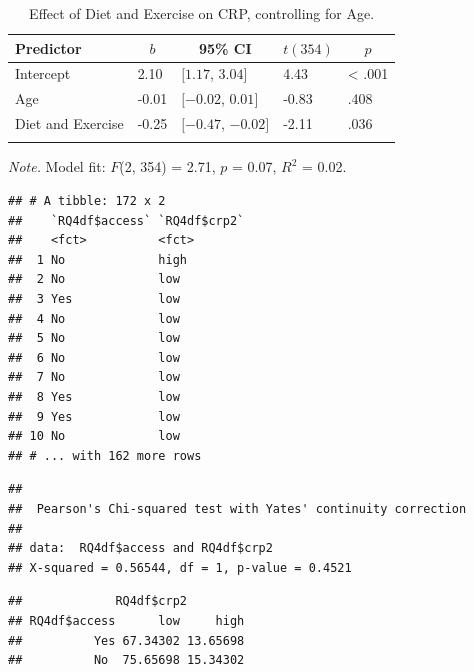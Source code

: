 \documentclass[
  man]{apa6}
\begin{document}
\begin{table}[tbp]

\begin{center}
\begin{threeparttable}

\caption{\label{tab:RQ2}Effect of Diet and Exercise on CRP, controlling for Age.}

\begin{tabular}{lllll}
\toprule
Predictor & \multicolumn{1}{c}{$b$} & \multicolumn{1}{c}{95\% CI} & \multicolumn{1}{c}{$t(354)$} & \multicolumn{1}{c}{$p$}\\
\midrule
Intercept & 2.10 & $[1.17$, $3.04]$ & 4.43 & < .001\\
Age & -0.01 & $[-0.02$, $0.01]$ & -0.83 & .408\\
Diet and Exercise & -0.25 & $[-0.47$, $-0.02]$ & -2.11 & .036\\
\bottomrule
\addlinespace
\end{tabular}

\begin{tablenotes}[para]
\normalsize{\textit{Note.} Model fit: $F$(2, 354) = 2.71, $p$ = 0.07, $R^2$ = 0.02.}
\end{tablenotes}

\end{threeparttable}
\end{center}

\end{table}

\begin{verbatim}
## # A tibble: 172 x 2
##    `RQ4df$access` `RQ4df$crp2`
##    <fct>          <fct>       
##  1 No             high        
##  2 No             low         
##  3 Yes            low         
##  4 No             low         
##  5 No             low         
##  6 No             low         
##  7 No             low         
##  8 Yes            low         
##  9 Yes            low         
## 10 No             low         
## # ... with 162 more rows
\end{verbatim}

\begin{verbatim}
## 
##  Pearson's Chi-squared test with Yates' continuity correction
## 
## data:  RQ4df$access and RQ4df$crp2
## X-squared = 0.56544, df = 1, p-value = 0.4521
\end{verbatim}

\begin{verbatim}
##             RQ4df$crp2
## RQ4df$access      low     high
##          Yes 67.34302 13.65698
##          No  75.65698 15.34302
\end{verbatim}
\end{document}
